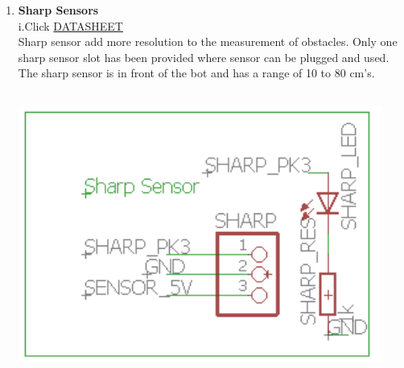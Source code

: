 \documentclass[a4paper,12pt,oneside]{book}
\begin{document}
\begin{enumerate}
    \newpage\item \textbf{Sharp Sensors}\\
    i.Click \href{https://www.sparkfun.com/datasheets/Sensors/Infrared/gp2y0a02yk_e.pdf}{DATASHEET}
    \\[0.5cm]Sharp sensor add more resolution to the measurement of obstacles. 
    Only one sharp sensor slot has been provided where sensor can be plugged and used. The sharp sensor is in front of the bot and has a range of 10 to 80 cm's. 
    \vspace*{1.5cm}
    \\\hfill\includegraphics[width=12cm, height=10cm]{sharp}
    

\end{enumerate}
\end{document}
